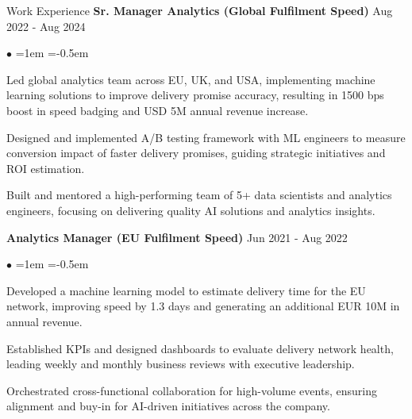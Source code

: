 \documentclass{resume}
\begin{document}
    \begin{rSection}{Work Experience}
                    {\textbf{Sr. Manager Analytics (Global Fulfilment Speed)}} \hfill {Aug 2022 - Aug 2024}
            \\ %
            {} \hfill {}
            \begin{list}{\tiny$\bullet$}{ %
                \leftmargin=1em
                \itemsep=-0.5em
                \vspace{-0.5em}
            }
                            \item Led global analytics team across EU, UK, and USA, implementing machine learning solutions to improve delivery promise accuracy, resulting in 1500 bps boost in speed badging and USD 5M annual revenue increase.
                            \item Designed and implemented A/B testing framework with ML engineers to measure conversion impact of faster delivery promises, guiding strategic initiatives and ROI estimation.
                            \item Built and mentored a high-performing team of 5+ data scientists and analytics engineers, focusing on delivering quality AI solutions and analytics insights.
                        \end{list}
            \vspace{0.1em}
                    {\textbf{Analytics Manager (EU Fulfilment Speed)}} \hfill {Jun 2021 - Aug 2022}
            \\ %
            {} \hfill {}
            \begin{list}{\tiny$\bullet$}{ %
                \leftmargin=1em
                \itemsep=-0.5em
                \vspace{-0.5em}
            }
                            \item Developed a machine learning model to estimate delivery time for the EU network, improving speed by 1.3 days and generating an additional EUR 10M in annual revenue.
                            \item Established KPIs and designed dashboards to evaluate delivery network health, leading weekly and monthly business reviews with executive leadership.
                            \item Orchestrated cross-functional collaboration for high-volume events, ensuring alignment and buy-in for AI-driven initiatives across the company.

\end{list}
\end{rSection}
\end{document}
